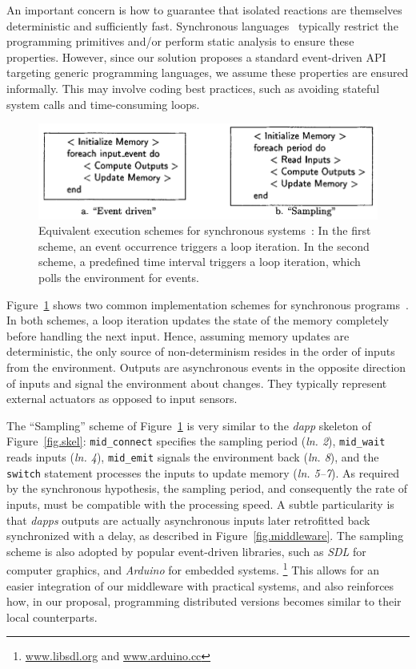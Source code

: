 \documentclass[sigplan,screen]{acmart}
\newcommand{\lin}[1]{(\emph{ln. #1}\xspace)}
\newcommand{\dapp}{\emph{dapp}\xspace}
\newcommand{\dapps}{\emph{dapps}\xspace}
\begin{document}
An important concern is how to guarantee that isolated reactions are themselves
deterministic and sufficiently fast.
Synchronous languages~\cite{langs} typically restrict the programming
primitives and/or perform static analysis to ensure these properties.
However, since our solution proposes a standard event-driven API targeting
generic programming languages, we assume these properties are ensured
informally.
This may involve coding best practices, such as avoiding stateful system calls
and time-consuming loops.

\begin{figure}[t]
  \centering
  \includegraphics[width=\linewidth]{schemes}
  \caption{
    \label{fig.schemes}
    Equivalent execution schemes for synchronous systems~\cite{schemes}:
    In the first scheme, an event occurrence triggers a loop iteration.
    In the second scheme, a predefined time interval triggers a loop iteration,
    which polls the environment for events.
  }
\end{figure}

Figure~\ref{fig.schemes} shows two common implementation schemes for
synchronous programs~\cite{schemes}.
In both schemes, a loop iteration updates the state of the memory completely
before handling the next input.
Hence, assuming memory updates are deterministic, the only source of
non-determinism resides in the order of inputs from the environment.
Outputs are asynchronous events in the opposite direction of inputs and
signal the environment about changes.
They typically represent external actuators as opposed to input sensors.

The ``Sampling'' scheme of Figure~\ref{fig.schemes} is very similar to the
\dapp skeleton of Figure~\ref{fig.skel}:
    \texttt{mid\_connect} specifies the sampling period \lin{2},
    \texttt{mid\_wait} reads inputs \lin{4},
    \texttt{mid\_emit} signals the environment back \lin{8}, and
    the \texttt{switch} statement processes the inputs to update memory \lin{5--7}.
As required by the synchronous hypothesis, the sampling period, and
consequently the rate of inputs, must be compatible with the processing speed.
A subtle particularity is that \dapps outputs are actually asynchronous inputs
later retrofitted back synchronized with a delay, as described in
Figure~\ref{fig.middleware}.
%
The sampling scheme is also adopted by popular event-driven libraries, such as
\emph{SDL} for computer graphics, and \emph{Arduino} for embedded systems.%
\footnote{\url{www.libsdl.org} and \url{www.arduino.cc}}
This allows for an easier integration of our middleware with practical systems,
and also reinforces how, in our proposal, programming distributed versions
becomes similar to their local counterparts.
\end{document}
